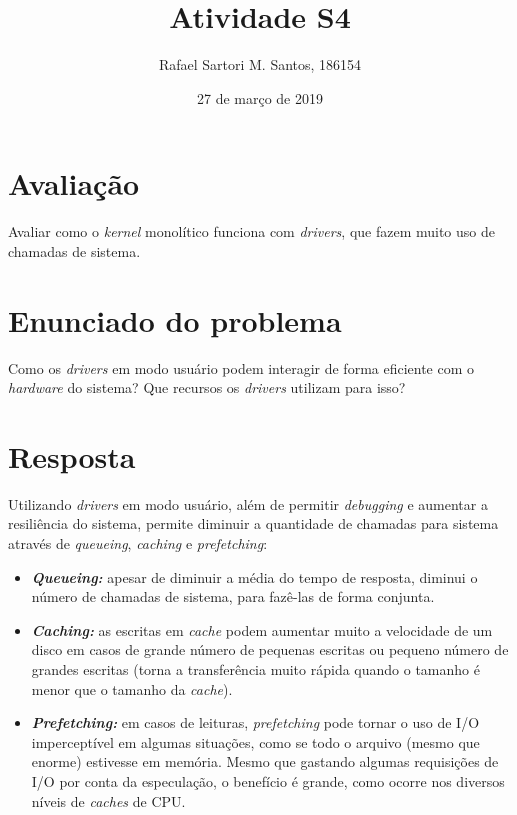\documentclass[brazilian,a4paper]{article}
\title{Atividade S4}
\author{Rafael Sartori M. Santos, 186154}
\date{27 de março de 2019}
\begin{document}
\maketitle

\section*{Avaliação}

Avaliar como o \textit{kernel} monolítico funciona com \textit{drivers}, que fazem muito uso de chamadas de sistema.

\section*{Enunciado do problema}

Como os \textit{drivers} em modo usuário podem interagir de forma eficiente com o \textit{hardware} do sistema? Que recursos os \textit{drivers} utilizam para isso?

\section*{Resposta}

Utilizando \textit{drivers} em modo usuário, além de permitir \textit{debugging} e aumentar a resiliência do sistema, permite diminuir a quantidade de chamadas para sistema através de \textit{queueing}, \textit{caching} e \textit{prefetching}:
\begin{itemize}
    \item \textbf{\textit{Queueing:}} apesar de diminuir a média do tempo de resposta, diminui o número de chamadas de sistema, para fazê-las de forma conjunta.
    \item \textbf{\textit{Caching:}} as escritas em \textit{cache} podem aumentar muito a velocidade de um disco em casos de grande número de pequenas escritas ou pequeno número de grandes escritas (torna a transferência muito rápida quando o tamanho é menor que o tamanho da \textit{cache}).
    \item \textbf{\textit{Prefetching:}} em casos de leituras, \textit{prefetching} pode tornar o uso de I/O imperceptível em algumas situações, como se todo o arquivo (mesmo que enorme) estivesse em memória. Mesmo que gastando algumas requisições de I/O por conta da especulação, o benefício é grande, como ocorre nos diversos níveis de \textit{caches} de CPU.
\end{itemize}
\end{document}
